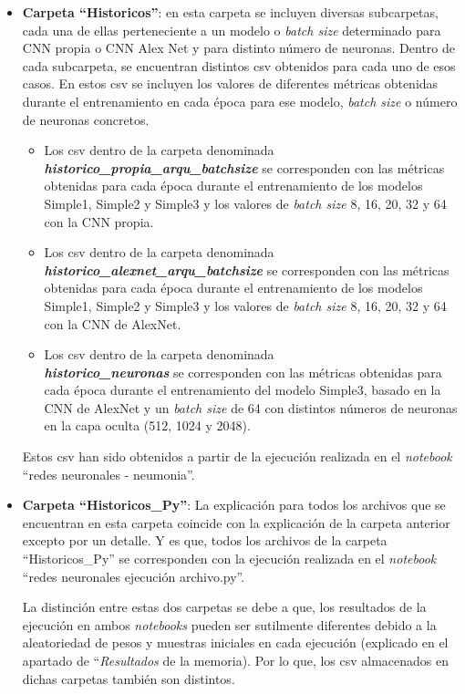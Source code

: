 \begin{itemize}
\begin{itemize}
\begin{itemize}
        \end{itemize}
        \item \textbf{Carpeta ``Historicos''}: en esta carpeta se incluyen diversas subcarpetas, cada una de ellas perteneciente a un modelo o \textit{batch size} determinado para CNN propia o CNN Alex Net y para distinto número de neuronas. Dentro de cada subcarpeta, se encuentran distintos csv obtenidos para cada uno de esos casos. En estos csv se incluyen los valores de diferentes métricas obtenidas durante el entrenamiento en cada época para ese modelo, \textit{batch size} o número de neuronas concretos.
        \begin{itemize}
            \item Los csv dentro de la carpeta denominada\\ \textit{\textbf{historico\_propia\_arqu\_batchsize}} se corresponden con las métricas obtenidas para cada época durante el entrenamiento de los modelos Simple1, Simple2 y Simple3 y los valores de \textit{batch size} 8, 16, 20, 32 y 64 con la CNN propia.
            \item Los csv dentro de la carpeta denominada\\ \textit{\textbf{historico\_alexnet\_arqu\_batchsize}} se corresponden con las métricas obtenidas para cada época durante el entrenamiento de los modelos Simple1, Simple2 y Simple3 y los valores de \textit{batch size} 8, 16, 20, 32 y 64 con la CNN de AlexNet.
            \item Los csv dentro de la carpeta denominada\\ \textit{\textbf{historico\_neuronas}} se corresponden con las métricas obtenidas para cada época durante el entrenamiento del modelo Simple3, basado en la CNN de AlexNet y un \textit{batch size} de 64 con distintos números de neuronas en la capa oculta (512, 1024 y 2048). 
            
        \end{itemize}
        Estos csv han sido obtenidos a partir de la ejecución realizada en el \textit{notebook} ``redes neuronales - neumonia''.
        \item \textbf{Carpeta ``Historicos\_Py''}: La explicación para todos los archivos que se encuentran en esta carpeta coincide con la explicación de la carpeta anterior excepto por un detalle. Y es que, todos los archivos de la carpeta ``Historicos\_Py'' se corresponden con la ejecución realizada en el \textit{notebook} ``redes neuronales ejecución archivo.py''. 
        
        La distinción entre estas dos carpetas se debe a que, los resultados de la ejecución en ambos \textit{notebooks} pueden ser sutilmente diferentes debido a la aleatoriedad de pesos y muestras iniciales en cada ejecución (explicado en el apartado de ``\textit{Resultados} de la memoria). Por lo que, los csv almacenados en dichas carpetas también son distintos.
        

\end{itemize}
\end{itemize}
